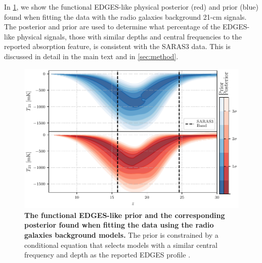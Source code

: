 In \cref{fig:EDGES-like}, we show the functional EDGES-like physical posterior (red) and prior (blue) found when fitting the data with the radio galaxies background 21-cm signals. The posterior and prior are used to determine what percentage of the EDGES-like physical signals, those with similar depths and central frequencies to the reported absorption feature, is consistent with the SARAS3 data. This is discussed in detail in the main text and in \cref{sec:method}.

\begin{figure}[ht!]
    \centering
    \includegraphics{saras3/figs/FigureS6.pdf}
    \caption{\textbf{The functional EDGES-like prior and the corresponding posterior found when fitting the data using the radio galaxies background models.} The prior is constrained by a conditional equation that selects models with a similar central frequency and depth as the reported EDGES profile \cite{Fialkov2019}.}
    \label{fig:EDGES-like}
\end{figure}